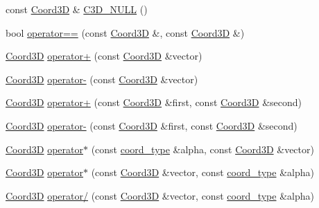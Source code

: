 \begin{DoxyCompactItemize}
\item 
const \hyperlink{classMcCAD_1_1Geometry_1_1Coord3D}{Coord3D} \& \hyperlink{namespaceMcCAD_1_1Geometry_ae08bc63c64f6c022b784d73e474724f3}{C3\+D\+\_\+\+N\+U\+LL} ()
\item 
bool \hyperlink{namespaceMcCAD_1_1Geometry_a003989b55df0450a39e806be1c569fdc}{operator==} (const \hyperlink{classMcCAD_1_1Geometry_1_1Coord3D}{Coord3D} \&, const \hyperlink{classMcCAD_1_1Geometry_1_1Coord3D}{Coord3D} \&)
\item 
\hyperlink{classMcCAD_1_1Geometry_1_1Coord3D}{Coord3D} \hyperlink{namespaceMcCAD_1_1Geometry_afe4b139d4360640fd7f84318b932b553}{operator+} (const \hyperlink{classMcCAD_1_1Geometry_1_1Coord3D}{Coord3D} \&vector)
\item 
\hyperlink{classMcCAD_1_1Geometry_1_1Coord3D}{Coord3D} \hyperlink{namespaceMcCAD_1_1Geometry_a1ee9892658d4cce528a46c21663b058f}{operator-\/} (const \hyperlink{classMcCAD_1_1Geometry_1_1Coord3D}{Coord3D} \&vector)
\item 
\hyperlink{classMcCAD_1_1Geometry_1_1Coord3D}{Coord3D} \hyperlink{namespaceMcCAD_1_1Geometry_a98c98429542a57a370528720836e7340}{operator+} (const \hyperlink{classMcCAD_1_1Geometry_1_1Coord3D}{Coord3D} \&first, const \hyperlink{classMcCAD_1_1Geometry_1_1Coord3D}{Coord3D} \&second)
\item 
\hyperlink{classMcCAD_1_1Geometry_1_1Coord3D}{Coord3D} \hyperlink{namespaceMcCAD_1_1Geometry_accc8c068bb6e7d639ab12dd0c1c4e3b9}{operator-\/} (const \hyperlink{classMcCAD_1_1Geometry_1_1Coord3D}{Coord3D} \&first, const \hyperlink{classMcCAD_1_1Geometry_1_1Coord3D}{Coord3D} \&second)
\item 
\hyperlink{classMcCAD_1_1Geometry_1_1Coord3D}{Coord3D} \hyperlink{namespaceMcCAD_1_1Geometry_a87df988e228ea78505cdec0ef872094d}{operator$\ast$} (const \hyperlink{namespaceMcCAD_1_1Geometry_ac043b37a4a7e849fca22869e1982d2f8}{coord\+\_\+type} \&alpha, const \hyperlink{classMcCAD_1_1Geometry_1_1Coord3D}{Coord3D} \&vector)
\item 
\hyperlink{classMcCAD_1_1Geometry_1_1Coord3D}{Coord3D} \hyperlink{namespaceMcCAD_1_1Geometry_ac97a3a216d9ae16f6059efd36a713b0e}{operator$\ast$} (const \hyperlink{classMcCAD_1_1Geometry_1_1Coord3D}{Coord3D} \&vector, const \hyperlink{namespaceMcCAD_1_1Geometry_ac043b37a4a7e849fca22869e1982d2f8}{coord\+\_\+type} \&alpha)
\item 
\hyperlink{classMcCAD_1_1Geometry_1_1Coord3D}{Coord3D} \hyperlink{namespaceMcCAD_1_1Geometry_add6875e4503620be3ec48e2037978b2f}{operator/} (const \hyperlink{classMcCAD_1_1Geometry_1_1Coord3D}{Coord3D} \&vector, const \hyperlink{namespaceMcCAD_1_1Geometry_ac043b37a4a7e849fca22869e1982d2f8}{coord\+\_\+type} \&alpha)

\end{DoxyCompactItemize}
